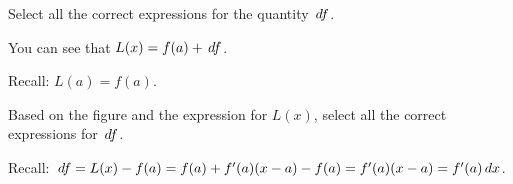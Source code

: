 \documentclass{ximera}
\begin{document}
  \begin{question}
  Select all the correct expressions for the quantity $\,d f$.
   \begin{hint}
     You can see that $L(x)=f(a)+\,d f$.
    \end{hint}
      \begin{hint}
    Recall: $L(a)=f(a)$.
    \end{hint}
    \begin{selectAll}
         
    \end{selectAll}
   
  \end{question}

 \begin{question}
Based on  the figure and the expression for $L(x)$, select all the correct expressions for $\,d f$.
 \begin{hint}
    Recall: $\,d f=L(x)-f(a)=f(a)+f'(a)(x-a)-f(a)=f'(a)(x-a)=f'(a)\,d x$.
    \end{hint}
      \begin{selectAll}
      \end{selectAll}
  \end{question}
  
\end{document}
